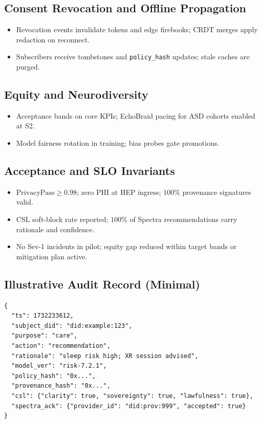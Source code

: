 \documentclass[11pt]{article}
\theoremstyle{plain}
\begin{document}
\subsection{Consent Revocation and Offline Propagation}
\begin{itemize}
  \item Revocation events invalidate tokens and edge firebooks; CRDT merges apply redaction on reconnect.
  \item Subscribers receive tombstones and \texttt{policy\_hash} updates; stale caches are purged.
\end{itemize}

\subsection{Equity and Neurodiversity}
\begin{itemize}
  \item Acceptance bands on core KPIs; EchoBraid pacing for ASD cohorts enabled at S2.
  \item Model fairness rotation in training; bias probes gate promotions.
\end{itemize}

\subsection{Acceptance and SLO Invariants}
\begin{itemize}
  \item $\mathrm{PrivacyPass}\ge 0.98$; zero PHI at HEP ingress; $100\%$ provenance signatures valid.
  \item CSL soft-block rate reported; $100\%$ of Spectra recommendations carry rationale and confidence.
  \item No Sev-1 incidents in pilot; equity gap reduced within target bands or mitigation plan active.
\end{itemize}

\subsection{Illustrative Audit Record (Minimal)}
\begin{verbatim}
{
  "ts": 1732233612,
  "subject_did": "did:example:123",
  "purpose": "care",
  "action": "recommendation",
  "rationale": "sleep risk high; XR session advised",
  "model_ver": "risk-7.2.1",
  "policy_hash": "0x...",
  "provenance_hash": "0x...",
  "csl": {"clarity": true, "sovereignty": true, "lawfulness": true},
  "spectra_ack": {"provider_id": "did:prov:999", "accepted": true}
}
\end{verbatim}
\end{document}
